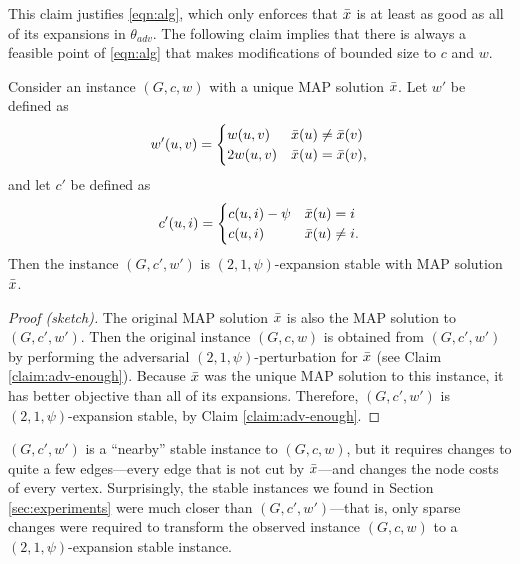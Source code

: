 This claim justifies \eqref{eqn:alg}, which only enforces that $\bar{x}$ is at least as good as all of its expansions in $\theta_{adv}$. The following claim implies that there is always a feasible point of \eqref{eqn:alg} that makes modifications of bounded size to $c$ and $w$.
\begin{claim}
Consider an instance $(G,c,w)$ with a unique MAP solution $\bar{x}$. Let $w'$ be defined as
\begin{equation*}
    w'(u,v) = \begin{cases}
    w(u,v) & \bar{x}(u) \ne \bar{x}(v)\\
    2w(u,v) & \bar{x}(u) = \bar{x}(v),
    \end{cases}
\end{equation*}
and let $c'$ be defined as
\begin{equation*}
c'(u,i) = \begin{cases}c(u,i) - \psi & \bar{x}(u) = i\\
c(u,i) & \bar{x}(u) \ne i.\end{cases}
\end{equation*}
Then the instance $(G,c',w')$ is $(2,1,\psi)$-expansion stable with MAP solution $\bar{x}$.
\end{claim}
\begin{proof}[Proof (sketch)]
The original MAP solution $\bar{x}$ is also the MAP solution to $(G,c',w')$. Then the original instance $(G,c,w)$ is obtained from $(G,c',w')$ by performing the adversarial $(2,1,\psi)$-perturbation for $\bar{x}$ (see Claim \ref{claim:adv-enough}). Because $\bar{x}$ was the unique MAP solution to this instance, it has better objective than all of its expansions. Therefore, $(G,c',w')$ is $(2,1,\psi)$-expansion stable, by Claim \ref{claim:adv-enough}.
\end{proof}
$(G,c',w')$ is a ``nearby'' stable instance to $(G,c,w)$, but it requires changes to quite a few edges---every edge that is not cut by $\bar{x}$---and changes the node costs of every vertex. Surprisingly, the stable instances we found in Section \ref{sec:experiments} were much closer than $(G,c',w')$---that is, only sparse changes were required to transform the observed instance $(G,c,w)$ to a $(2,1,\psi)$-expansion stable instance.

